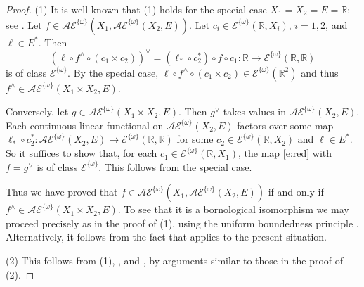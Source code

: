 \documentclass[10pt, reqno]{amsart}
\theoremstyle{plain}
\theoremstyle{definition}
\numberwithin{equation}{section}
\def\om{\omega}
\def\R{\mathbb{R}}
\def\cE{\mathcal{E}}
\renewcommand{\o}{\circ}
\def\AU{\mathcal{AE}^{\{\omega\}}}
\begin{document}
\begin{proof}
    (1) It is well-known that (1) holds for the special case $X_1=X_2 =E=\R$; see \cite{Schindl14a}.
    Let $f \in \AU(X_1,\AU(X_2,E))$. 
    Let $c_i \in \cE^{\{\om\}}(\R,X_i)$, $i=1,2$, and $\ell \in E^*$. 
    Then 
    \begin{equation} \label{e:red}
        (\ell \o f^\wedge \o (c_1 \times c_2))^\vee = (\ell_* \o c_2^*) \o f \o c_1 : \R \to \cE^{\{\om\}}(\R,\R)
    \end{equation}
    is of class $\cE^{\{\om\}}$. By the special case, $\ell \o f^\wedge \o (c_1 \times c_2) \in \cE^{\{\om\}}(\R^2)$ 
    and thus $f^\wedge \in \AU(X_1\times X_2,E)$.

    Conversely, let $g \in \AU(X_1\times X_2,E)$. Then $g^\vee$ takes values in $\AU(X_2,E)$.
    Each continuous linear functional on $\AU(X_2,E)$ factors over 
    some map $\ell_* \o c_2^* : \AU(X_2,E) \to \cE^{\{\om\}}(\R,\R)$ 
    for some $c_2 \in \cE^{\{\om\}}(\R,X_2)$ and $\ell \in E^*$.
    So it suffices to show that, for each $c_1 \in \cE^{\{\om\}}(\R,X_1)$, the map \eqref{e:red} 
    with $f=g^\vee$ is of class $\cE^{\{\om\}}$. 
    This follows from the special case.

    Thus we have proved that $f \in \AU(X_1,\AU(X_2,E))$ if and only if $f^\wedge \in \AU(X_1 \times X_2,E)$.
    To see that it is a bornological isomorphism we may proceed precisely as in the proof of 
    (1), using the uniform boundedness principle .
    Alternatively, it follows from the fact that  applies to the present situation.


    (2) This follows from (1), , and , by arguments similar to those 
    in the proof of (2). 
\end{proof}



\appendix

\section{} \label{sec:appendix}
\end{document}
